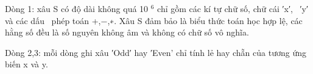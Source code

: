 Dòng 1: xâu S có độ dài không quá 10   $^    6   $   chỉ gồm các kí tự chữ số, chữ cái ′x′,  ′y′ và các dấu  phép toán +,−,∗. Xâu S đảm bảo là biểu thức toán học hợp lệ, các hằng số đều là số nguyên không âm và không có chữ số vô nghĩa.  

   Dòng 2,3: mỗi dòng ghi xâu ′Odd′ hay ′Even' chỉ tính lẻ hay chẵn của tương ứng biến x và y.